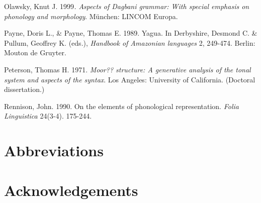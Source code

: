\documentclass[output=paper]{langsci/langscibook}
\begin{document}
Olawsky, Knut J. 1999\textit{. Aspects of Dagbani grammar: With special emphasis on phonology and morphology}. M\"{u}nchen: LINCOM Europa.

Payne, Doris L., \& Payne, Thomas E. 1989. Yagua. In Derbyshire, Desmond C. \& Pullum, Geoffrey K. (eds.), \textit{Handbook of Amazonian languages} 2, 249-474. Berlin: Mouton de Gruyter.

Peterson, Thomas H. 1971. \textit{Moor?? structure: A generative analysis of the tonal system and aspects of the syntax}. Los Angeles: University of California. (Doctoral dissertation.) 

Rennison, John. 1990.  On the elements of phonological representation. \textit{Folia Linguistica} 24(3-4). 175-244. 



\section*{Abbreviations}
\section*{Acknowledgements}

{\sloppy
\printbibliography[heading=subbibliography,notkeyword=this]
}
\end{document}

